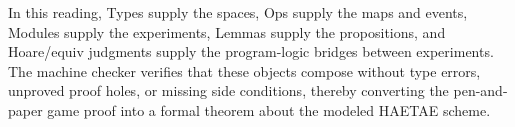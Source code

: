 In this reading, Types supply the spaces, Ops supply the maps and events,
Modules supply the experiments, Lemmas supply the propositions, and
Hoare/equiv judgments supply the program-logic bridges between experiments.
The machine checker verifies that these objects compose without type errors,
unproved proof holes, or missing side conditions, thereby converting the
pen-and-paper game proof into a formal theorem about the modeled HAETAE scheme.
